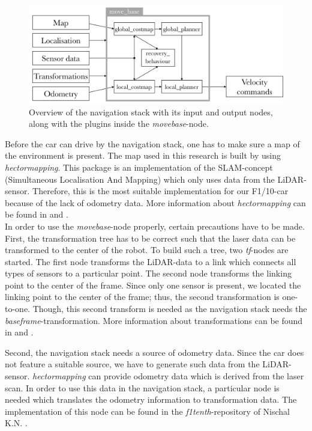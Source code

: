 \documentclass[conference,a4paper]{IEEEtran}
\begin{document}
\begin{figure}[!t]
    \includegraphics[width=\columnwidth]{navstack3}
    \centering
    \caption{Overview of the navigation stack with its input and output nodes, along with the plugins inside the \emph{move\textunderscore base}-node.}
    \label{fig:navstack_global}
\end{figure}

\noindent Before the car can drive by the navigation stack, one has to make sure a map of the environment is present. The map used in this research is built by using \emph{hector\textunderscore mapping}. This package is an implementation of the SLAM-concept (Simultaneous Localisation And Mapping) which only uses data from the LiDAR-sensor. Therefore, this is the most suitable implementation for our F1/10-car because of the lack of odometry data. More information about \emph{hector\textunderscore mapping} can be found in \cite{Kohlbrecher2012} and \cite{Kohlbrecher2011}. \\

\noindent In order to use the \emph{move\textunderscore base}-node properly, certain precautions have to be made. First, the transformation tree has to be correct such that the laser data can be transformed to the center of the robot. To build such a tree, two \emph{tf}-nodes are started. The first node transforms the LiDAR-data to a link which connects all types of sensors to a particular point. The second node transforms the linking point to the center of the frame. Since only one sensor is present, we located the linking point to the center of the frame; thus, the second transformation is one-to-one. Though, this second transform is needed as the navigation stack needs the \emph{base\textunderscore frame}-transformation. More information about transformations can be found in \cite{Kohlbrecher2012_tf} and \cite{Woodall2015}.

Second, the navigation stack needs a source of odometry data. Since the car does not feature a suitable source, we have to generate such data from the LiDAR-sensor. \emph{hector\textunderscore mapping} can provide odometry data which is derived from the laser scan. In order to use this data in the navigation stack, a particular node is needed which translates the odometry information to transformation data. The implementation of this node can be found in the \emph{f1tenth}-repository of Nischal K.N. \cite{K.N.2016}.
\end{document}
